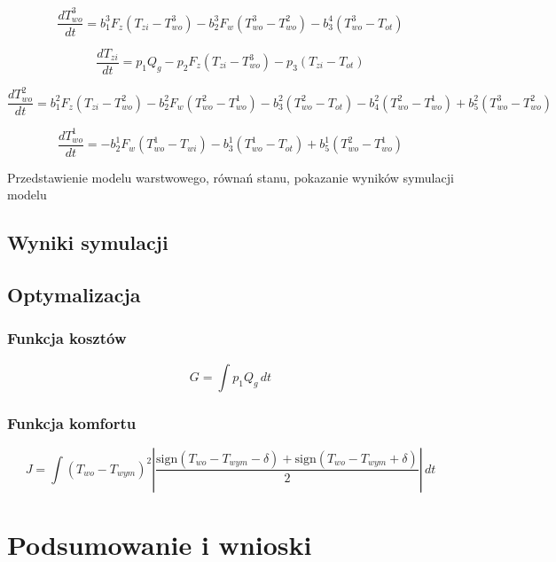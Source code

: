 \documentclass[a4paper,twoside,12pt]{book}
\begin{document}
\begin{equation}
  \frac{dT_{wo}^{3}}{dt} = b_1^3 F_z (T_{zi} - T_{wo}^{3}) - b_2^3 F_w (T_{wo}^{3} - T_{wo}^{2}) - b_3^4 (T_{wo}^{3} - T_{ot})
\end{equation}

\begin{equation}
  \frac{dT_{zi}}{dt} = p_1 Q_g - p_2 F_z (T_{zi} - T_{wo}^{3}) - p_3 (T_{zi} - T_{ot})
\end{equation}

\begin{equation}
  \frac{dT_{wo}^{2}}{dt} = b_1^2 F_z (T_{zi} - T_{wo}^{2}) - b_2^2 F_w (T_{wo}^{2} - T_{wo}^{1}) - b_3^2 (T_{wo}^{2} - T_{ot}) - b_4^2 (T_{wo}^{2} - T_{wo}^{1}) + b_5^2 (T_{wo}^{3} - T_{wo}^{2})
\end{equation}

\begin{equation}
  \frac{dT_{wo}^{1}}{dt} = -b_2^1 F_w (T_{wo}^{1} - T_{wi}) - b_3^1 (T_{wo}^{1} - T_{ot}) + b_5^1 (T_{wo}^{2} - T_{wo}^{1})
\end{equation}

Przedstawienie modelu warstwowego, równań stanu, pokazanie wyników symulacji modelu
\section{Wyniki symulacji}

\newpage
\section{Optymalizacja}
\subsection{Funkcja kosztów}
\begin{equation}
  G = \int p_1 Q_g \, dt
\end{equation}
\subsection{Funkcja komfortu}
\begin{equation}
  J = \int \left( T_{wo} - T_{wym} \right)^2 \left| \frac{\text{sign}(T_{wo} - T_{wym} - \delta) + \text{sign}(T_{wo} - T_{wym} + \delta)}{2} \right| \, dt
\end{equation}




\chapter{Podsumowanie i wnioski}
\end{document}
